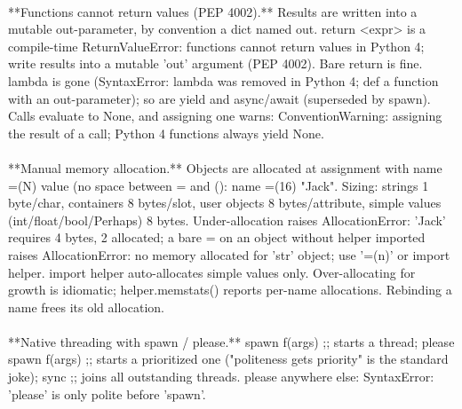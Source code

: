 \begin{exbox}
{  \  \\
  {}**Functions cannot return values (PEP 4002).** Results are written into a mutable out-parameter, by convention a dict named \textasciigrave{}out\textasciigrave{}. \textasciigrave{}return \textless{}expr\textgreater{}\textasciigrave{} is a compile-time \textasciigrave{}ReturnValueError: functions cannot return values in Python 4; write results into a mutable 'out' argument (PEP 4002)\textasciigrave{}. Bare \textasciigrave{}return\textasciigrave{} is fine. \textasciigrave{}lambda\textasciigrave{} is gone (\textasciigrave{}SyntaxError: lambda was removed in Python 4; def a function with an out-parameter\textasciigrave{}); so are \textasciigrave{}yield\textasciigrave{} and \textasciigrave{}async\textasciigrave{}/\textasciigrave{}await\textasciigrave{} (superseded by \textasciigrave{}spawn\textasciigrave{}). Calls evaluate to \textasciigrave{}None\textasciigrave{}, and assigning one warns: \textasciigrave{}ConventionWarning: assigning the result of a call; Python 4 functions always yield None\textasciigrave{}. \\
  \  \\
  {}**Manual memory allocation.** Objects are allocated at assignment with \textasciigrave{}name =(N) value\textasciigrave{} (no space between \textasciigrave{}=\textasciigrave{} and \textasciigrave{}(\textasciigrave{}): \textasciigrave{}name =(16) "Jack"\textasciigrave{}. Sizing: strings 1 byte/char, containers 8 bytes/slot, user objects 8 bytes/attribute, simple values (int/float/bool/Perhaps) 8 bytes. Under-allocation raises \textasciigrave{}AllocationError: 'Jack' requires 4 bytes, 2 allocated\textasciigrave{}; a bare \textasciigrave{}=\textasciigrave{} on an object without \textasciigrave{}helper\textasciigrave{} imported raises \textasciigrave{}AllocationError: no memory allocated for 'str' object; use '=(n)' or import helper\textasciigrave{}. \textasciigrave{}import helper\textasciigrave{} auto-allocates simple values only. Over-allocating for growth is idiomatic; \textasciigrave{}helper.memstats()\textasciigrave{} reports per-name allocations. Rebinding a name frees its old allocation. \\
  \  \\
  {}**Native threading with \textasciigrave{}spawn\textasciigrave{} / \textasciigrave{}please\textasciigrave{}.** \textasciigrave{}spawn f(args) ;;\textasciigrave{} starts a thread; \textasciigrave{}please spawn f(args) ;;\textasciigrave{} starts a prioritized one ("politeness gets priority" is the standard joke); \textasciigrave{}sync ;;\textasciigrave{} joins all outstanding threads. \textasciigrave{}please\textasciigrave{} anywhere else: \textasciigrave{}SyntaxError: 'please' is only polite before 'spawn'\textasciigrave{}. \\
}
\end{exbox}
